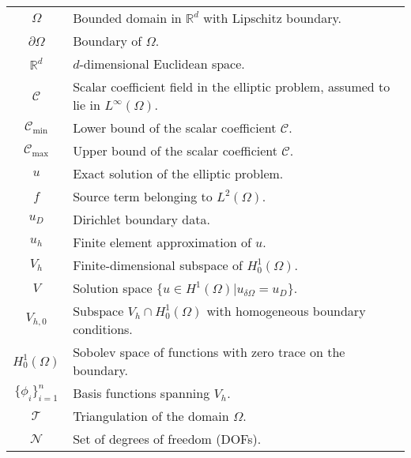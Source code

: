 \begin{longtable}{c p{10cm}}
    $\Omega$               & Bounded domain in $\mathbb{R}^d$ with Lipschitz boundary.                               \\
    $\partial \Omega$      & Boundary of $\Omega$.                                                                   \\
    $\mathbb{R}^d$         & $d$-dimensional Euclidean space.                                                        \\
    $\mathcal{C}$          & Scalar coefficient field in the elliptic problem, assumed to lie in $L^\infty(\Omega)$. \\
    $\mathcal{C}_{\min}$   & Lower bound of the scalar coefficient $\mathcal{C}$.                                    \\
    $\mathcal{C}_{\max}$   & Upper bound of the scalar coefficient $\mathcal{C}$.                                    \\
    $u$                    & Exact solution of the elliptic problem.                                                 \\
    $f$                    & Source term belonging to $L^2(\Omega)$.                                                 \\
    $u_D$                  & Dirichlet boundary data.                                                                \\
    $u_h$                  & Finite element approximation of $u$.                                                    \\
    $V_h$                  & Finite-dimensional subspace of $H_0^1(\Omega)$.                                         \\
    $V$                    & Solution space $\{u\in H^1(\Omega) | u_{\delta \Omega} = u_D\}$.                        \\
    $V_{h,0}$              & Subspace $V_h\cap H^1_0(\Omega)$ with homogeneous boundary conditions.                  \\
    $H^1_0(\Omega)$        & Sobolev space of functions with zero trace on the boundary.                             \\
    $\{\phi_i\}_{i=1}^{n}$ & Basis functions spanning $V_h$.                                                         \\
    $\mathcal{T}$          & Triangulation of the domain $\Omega$.                                                   \\
    $\mathcal{N}$          & Set of degrees of freedom (DOFs).                                                       \\

\end{longtable}
